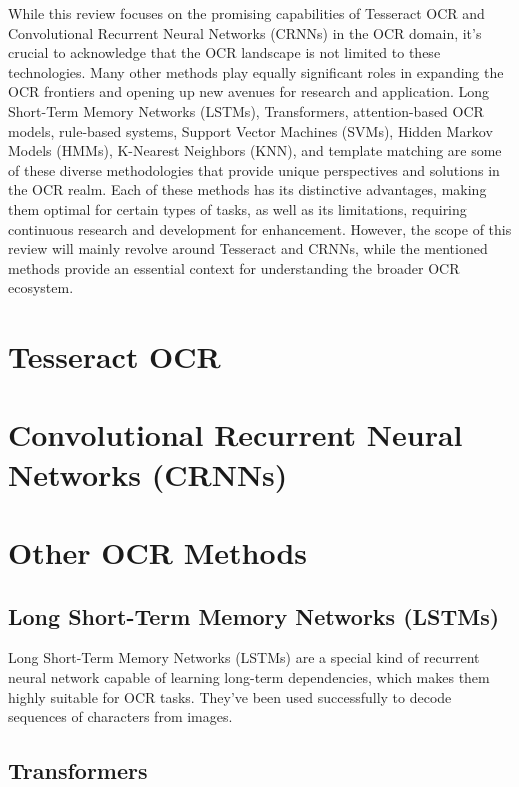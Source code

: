 While this review focuses on the promising capabilities of Tesseract OCR and Convolutional Recurrent Neural Networks (CRNNs) in the OCR domain, it's crucial to acknowledge that the OCR landscape is not limited to these technologies. Many other methods play equally significant roles in expanding the OCR frontiers and opening up new avenues for research and application. Long Short-Term Memory Networks (LSTMs), Transformers, attention-based OCR models, rule-based systems, Support Vector Machines (SVMs), Hidden Markov Models (HMMs), K-Nearest Neighbors (KNN), and template matching are some of these diverse methodologies that provide unique perspectives and solutions in the OCR realm. Each of these methods has its distinctive advantages, making them optimal for certain types of tasks, as well as its limitations, requiring continuous research and development for enhancement. However, the scope of this review will mainly revolve around Tesseract and CRNNs, while the mentioned methods provide an essential context for understanding the broader OCR ecosystem.


\section{Tesseract OCR}

\section{Convolutional Recurrent Neural Networks (CRNNs)}

\section{Other OCR Methods}

\subsection{Long Short-Term Memory Networks (LSTMs)}

Long Short-Term Memory Networks (LSTMs) are a special kind of recurrent neural network capable of learning long-term dependencies, which makes them highly suitable for OCR tasks. They've been used successfully to decode sequences of characters from images.\cite{breuelHighPerformanceOCRPrinted2013}


\subsection{Transformers}

